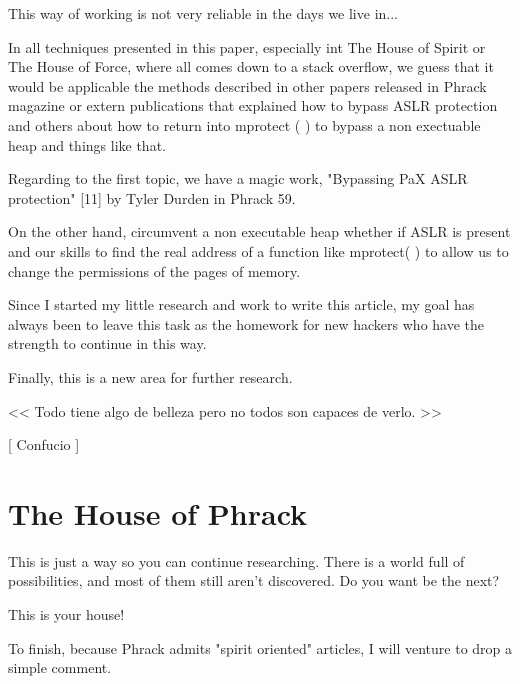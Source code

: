\documentclass[12pt]{article}
\begin{document}
This way of working is not very reliable in the days we live in...
\newline


In all techniques presented in this paper, especially int The House of
Spirit or The House of Force, where all comes down to a stack overflow, we
guess that it would be applicable the methods described in other papers
released in Phrack magazine or extern publications that explained how to
bypass ASLR protection and others about how to return into mprotect ( ) to
bypass a non exectuable heap and things like that.
\newline


Regarding to the first topic, we have a magic work, "Bypassing PaX ASLR
protection" [11] by Tyler Durden in Phrack 59.
\newline


On the other hand, circumvent a non executable heap whether if ASLR is
present and our skills to find the real address of a function like
mprotect( ) to allow us to change the permissions of the pages of memory.
\newline


Since I started my little research and work to write this article, my goal
has always been to leave this task as the homework for new hackers who
have the strength to continue in this way.
\newline


Finally, this is a new area for further research.


\begin{verbnobox}[\small]
                 << Todo tiene algo de belleza pero
                    no todos son capaces de verlo. >>

                                         [ Confucio ]
\end{verbnobox}


\section{The House of Phrack}
	
This is just a way so you can continue researching. There is a world full
of possibilities, and most of them still aren't discovered. Do you want
be the next?
\newline


This is your house!
\newline



To finish, because Phrack admits "spirit oriented" articles, I will
venture to drop a simple comment.
\newline
\end{document}
